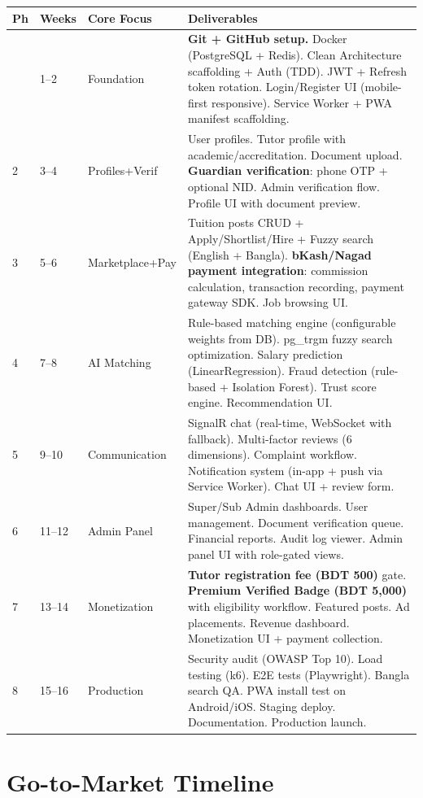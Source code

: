 \documentclass[12pt,a4paper,twoside]{report}
\begin{document}
\begin{longtable}{p{0.7cm}|p{1.8cm}|p{2cm}|p{8cm}}
\toprule
\textbf{Ph} & \textbf{Weeks} & \textbf{Core Focus} & \textbf{Deliverables} \\
\midrule
\endhead
\bottomrule
\endfoot
1  & 1--2  & Foundation & \textbf{Git + GitHub setup.} Docker (PostgreSQL + Redis). Clean Architecture scaffolding + Auth (TDD). JWT + Refresh token rotation. Login/Register UI (mobile-first responsive). Service Worker + PWA manifest scaffolding. \\
2  & 3--4  & Profiles+Verif & User profiles. Tutor profile with academic/accreditation. Document upload. \textbf{Guardian verification}: phone OTP + optional NID. Admin verification flow. Profile UI with document preview. \\
3  & 5--6  & Marketplace+Pay & Tuition posts CRUD + Apply/Shortlist/Hire + Fuzzy search (English + Bangla). \textbf{bKash/Nagad payment integration}: commission calculation, transaction recording, payment gateway SDK. Job browsing UI. \\
4  & 7--8  & AI Matching & Rule-based matching engine (configurable weights from DB). pg\_trgm fuzzy search optimization. Salary prediction (LinearRegression). Fraud detection (rule-based + Isolation Forest). Trust score engine. Recommendation UI. \\
5  & 9--10 & Communication & SignalR chat (real-time, WebSocket with fallback). Multi-factor reviews (6 dimensions). Complaint workflow. Notification system (in-app + push via Service Worker). Chat UI + review form. \\
6  & 11--12 & Admin Panel & Super/Sub Admin dashboards. User management. Document verification queue. Financial reports. Audit log viewer. Admin panel UI with role-gated views. \\
7  & 13--14 & Monetization & \textbf{Tutor registration fee (BDT 500)} gate. \textbf{Premium Verified Badge (BDT 5,000)} with eligibility workflow. Featured posts. Ad placements. Revenue dashboard. Monetization UI + payment collection. \\
8  & 15--16 & Production & Security audit (OWASP Top 10). Load testing (k6). E2E tests (Playwright). Bangla search QA. PWA install test on Android/iOS. Staging deploy. Documentation. Production launch. \\
\bottomrule
\end{longtable}

\section{Go-to-Market Timeline}
\end{document}
